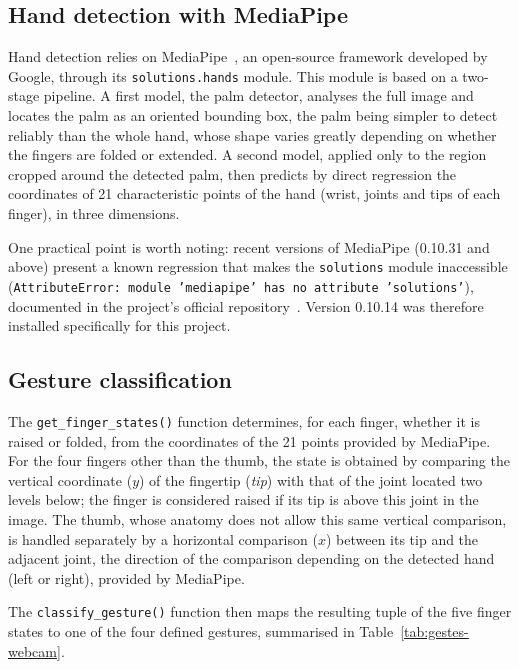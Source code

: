 \documentclass[12pt,a4paper]{report}
\begin{document}
	\subsection*{Hand detection with MediaPipe}
	
	Hand detection relies on MediaPipe~\cite{mediapipe_hands}, an open-source framework developed by Google, through its \texttt{solutions.hands} module. This module is based on a two-stage pipeline. A first model, the palm detector, analyses the full image and locates the palm as an oriented bounding box, the palm being simpler to detect reliably than the whole hand, whose shape varies greatly depending on whether the fingers are folded or extended. A second model, applied only to the region cropped around the detected palm, then predicts by direct regression the coordinates of 21 characteristic points of the hand (wrist, joints and tips of each finger), in three dimensions.
	
	One practical point is worth noting: recent versions of MediaPipe (0.10.31 and above) present a known regression that makes the \texttt{solutions} module inaccessible \\ (\texttt{AttributeError: module 'mediapipe' has no attribute 'solutions'}), documented in the project's official repository~\cite{mediapipe_issue6200}. Version 0.10.14 was therefore installed specifically for this project.
	
	\subsection*{Gesture classification}
	
	The \texttt{get\_finger\_states()} function determines, for each finger, whether it is raised or folded, from the coordinates of the 21 points provided by MediaPipe. For the four fingers other than the thumb, the state is obtained by comparing the vertical coordinate ($y$) of the fingertip (\textit{tip}) with that of the joint located two levels below; the finger is considered raised if its tip is above this joint in the image. The thumb, whose anatomy does not allow this same vertical comparison, is handled separately by a horizontal comparison ($x$) between its tip and the adjacent joint, the direction of the comparison depending on the detected hand (left or right), provided by MediaPipe.
	
	The \texttt{classify\_gesture()} function then maps the resulting tuple of the five finger states to one of the four defined gestures, summarised in Table~\ref{tab:gestes-webcam}.
	
\end{document}
